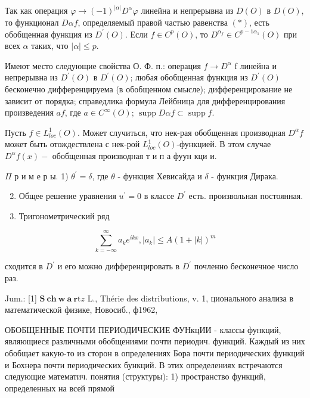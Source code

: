 \documentclass[10pt]{article}
\begin{document}
Так как операция $\varphi \rightarrow(-1)^{|\alpha|} D^{\alpha} \varphi$ линейна и непрерывна из $D(O)$ в $D(O)$, то функционал $D \alpha f$, определяемый правой частью равенства $(*)$, есть обобщенная функция из $D^{\prime}(O)$. Если $f \in C^{p}(O)$, то $D^{\alpha_{f}} \in C^{p-1 \alpha_{1}}(O)$ при всех $\alpha$ таких, что $|\alpha| \leqslant p$.



Имеют место следующие свойства О. Ф. п.: операция $f \rightarrow D^{\alpha}$ f линейна и непрерывна из $D^{\prime}(O)$ в $D^{\prime}(O)$; любая обобщенная функция из $D^{\prime}(O)$ бесконечно дифференцируема (в обобщенном смысле); дифференцирование не зависит от порядка; справедлика формула Лейбница для дифференцирования произведения $a f$, где $a \in C^{\infty}(O)$; $\operatorname{supp} D \alpha f \subset \operatorname{supp} f$.



Пусть $f \in L_{l o c}^{1}(O)$. Может случиться, что нек-рая обобщенная производная $D^{\alpha} f$ может быть отождествлена с нек-рой $L_{l o c}^{1}(O)$-функцией. В этом случае $D^{\alpha} f(x)-$ обобщенная производная т и п а фуун кци и.



$\Pi$ р и м е р ы. 1) $\theta^{\prime}=\delta$, где $\theta$ - функция Хевисайда и $\delta$ - функция Дирака.



\begin{enumerate}

  \setcounter{enumi}{1}

  \item Общее решение уравнения $u^{\prime}=0$ в классе $D^{\prime}$ есть. произвольная постоянная.



  \item Тригонометрический ряд



\end{enumerate}



\[

\sum_{k=-\infty}^{\infty} a_{k} e^{i k x},\left|a_{k}\right| \leqslant A(1+|k|)^{m}

\]



сходится в $D^{\prime}$ и его можно дифференцировать в $D^{\prime}$ почленно бесконечное число раз.



Jum.: [1] $\mathbf{S ~ c h ~ w ~ a ~} \mathbf{r} \mathrm{t} z$ L., Thérie des distributions, v. 1, ционального анализа в математической физике, Новосиб., ф1962,



ОБОБЩЕННЫЕ ПОЧТИ ПЕРИОДИЧЕСКИЕ ФУНкцИИ - классы функций, являющиеся различными обобщениями почти периодич. функций. Каждый из них обобщает какую-то из сторон в определениях Бора почти периодических функций и Бохнера почти периодических бункций. В этих определениях встречаются следующие математич. понятия (структуры): 1) пространство функций, определенных на всей прямой
\end{document}
